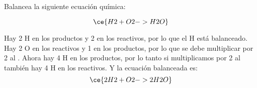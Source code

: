 Balancea la siguiente ecuación química:

\[
    \ce{H2 + O2 -> H2O}
\]

\begin{solutionbox}{3cm}
    Hay 2 H en los productos y 2 en los reactivos, por lo que el H está balanceado.
    Hay 2 O en los reactivos y 1 en los productos, por lo que se debe multiplicar por 2 al .
    Ahora hay 4 H en los productos, por lo tanto si multiplicamos por 2 al  también hay 4 H en los reactivos.
    Y la ecuación balanceada es:
    \[
        \ce{2H2 + O2 -> 2H2O}
    \]
\end{solutionbox}
